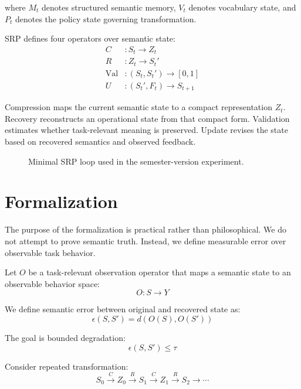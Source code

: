 \documentclass{article}
\begin{document}
where $M_t$ denotes structured semantic memory, $V_t$ denotes vocabulary state, and $P_t$ denotes the policy state governing transformation.

SRP defines four operators over semantic state:
\begin{align}
C &: S_t \to Z_t \\
R &: Z_t \to S_t' \\
\mathrm{Val} &: (S_t, S_t') \to [0,1] \\
U &: (S_t', F_t) \to S_{t+1}
\end{align}

Compression maps the current semantic state to a compact representation $Z_t$. Recovery reconstructs an operational state from that compact form. Validation estimates whether task-relevant meaning is preserved. Update revises the state based on recovered semantics and observed feedback.

\begin{figure}[t]
  \centering
  \caption{Minimal SRP loop used in the semester-version experiment.}
  \label{fig:algorithm}
\end{figure}

\section{Formalization}
The purpose of the formalization is practical rather than philosophical. We do not attempt to prove semantic truth. Instead, we define measurable error over observable task behavior.

Let $O$ be a task-relevant observation operator that maps a semantic state to an observable behavior space:
\begin{equation}
O : S \to Y
\end{equation}

We define semantic error between original and recovered state as:
\begin{equation}
\epsilon(S, S') = d(O(S), O(S'))
\end{equation}

The goal is bounded degradation:
\begin{equation}
\epsilon(S, S') \le \tau
\end{equation}

Consider repeated transformation:
\begin{equation}
S_0 \xrightarrow{C} Z_0 \xrightarrow{R} S_1 \xrightarrow{C} Z_1 \xrightarrow{R} S_2 \to \cdots
\end{equation}
\end{document}

